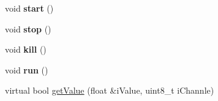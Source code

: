 \begin{DoxyCompactItemize}
\item 
\hypertarget{class_c_b_m_a180_ad026d7a4be6c394c5826a667fc2803c8}{void {\bfseries start} ()}\label{class_c_b_m_a180_ad026d7a4be6c394c5826a667fc2803c8}

\item 
\hypertarget{class_c_b_m_a180_a9c54282ad9d0ea67093ae901f4205869}{void {\bfseries stop} ()}\label{class_c_b_m_a180_a9c54282ad9d0ea67093ae901f4205869}

\item 
\hypertarget{class_c_b_m_a180_a76999767859139f406b78aca9aacb202}{void {\bfseries kill} ()}\label{class_c_b_m_a180_a76999767859139f406b78aca9aacb202}

\item 
\hypertarget{class_c_b_m_a180_ad3ee3468195d3473ffbc3a9cbd8e6e5f}{void {\bfseries run} ()}\label{class_c_b_m_a180_ad3ee3468195d3473ffbc3a9cbd8e6e5f}

\item 
virtual bool \hyperlink{class_c_b_m_a180_a3b4fca3c7e96f59da8f53c5a795cbbcb}{get\-Value} (float \&i\-Value, uint8\-\_\-t i\-Channle)
\end{DoxyCompactItemize}


